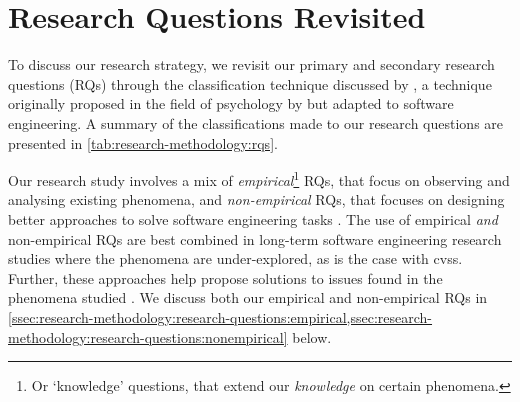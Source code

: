 \section{Research Questions Revisited}
\label{sec:research-methodology:research-questions}


To discuss our research strategy, we revisit our \NumPrimaryRQs{} primary and \NumSecondaryRQs{} secondary research questions (RQs) through the classification technique discussed by \citet{Easterbrook:2007ws}, a technique originally proposed in the field of psychology by \citet{Meltzoff:1998wg} but adapted to software engineering. A summary of the classifications made to our research questions are presented in \cref{tab:research-methodology:rqs}.

Our research study involves a mix of \NumEmpiricalRQs{} \textit{empirical}\footnote{Or `knowledge' questions, that extend our \textit{knowledge} on certain phenomena.} RQs, that focus on observing and analysing existing phenomena, and \NumNonEmpiricalRQs{} \textit{non-empirical} RQs, that focuses on designing better approaches to solve software engineering tasks \citep{Simon:1996uw}. The use of empirical \textit{and} non-empirical RQs are best combined in long-term software engineering research studies where the phenomena are under-explored, as is the case with \glspl{cvs}. Further, these approaches help propose solutions to issues found in the phenomena studied \citep{Wieringa:2006vd}. We discuss both our empirical and non-empirical RQs in \cref{ssec:research-methodology:research-questions:empirical,ssec:research-methodology:research-questions:nonempirical} below. 

